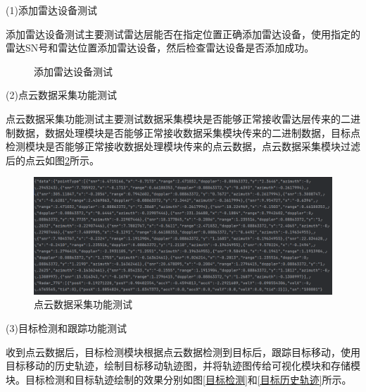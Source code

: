 \par
(1)添加雷达设备测试
\par
添加雷达设备测试主要测试雷达层能否在指定位置正确添加雷达设备，使用指定的雷达SN号和雷达位置添加雷达设备，然后检查雷达设备是否添加成功。
\begin{figure}[htbp]
    \centering
    \caption{添加雷达设备测试}
    \label{fig:添加雷达设备测试}    
\end{figure}
\par
(2)点云数据采集功能测试
\par
点云数据采集功能测试主要测试数据采集模块是否能够正常接收雷达层传来的二进制数据，数据处理模块是否能够正常接收数据采集模块传来的二进制数据，目标点检测模块是否能够正常接收数据处理模块传来的点云数据，点云数据采集模块过滤后的点云如图\ref{fig:点云数据采集功能测试}所示。
\begin{figure}[htbp]
    \centering
    \includegraphics[width = 0.8\linewidth]{images/点云数据.png}
    \caption{点云数据采集功能测试}
    \label{fig:点云数据采集功能测试}    
\end{figure}

\par
(3)目标检测和跟踪功能测试
\par
收到点云数据后，目标检测模块根据点云数据检测到目标后，跟踪目标移动，使用目标移动的历史轨迹，绘制目标移动轨迹图，并将轨迹图传给可视化模块和存储模块。目标检测和目标轨迹绘制的效果分别如图\ref{目标检测}和\ref{目标历史轨迹}所示。

